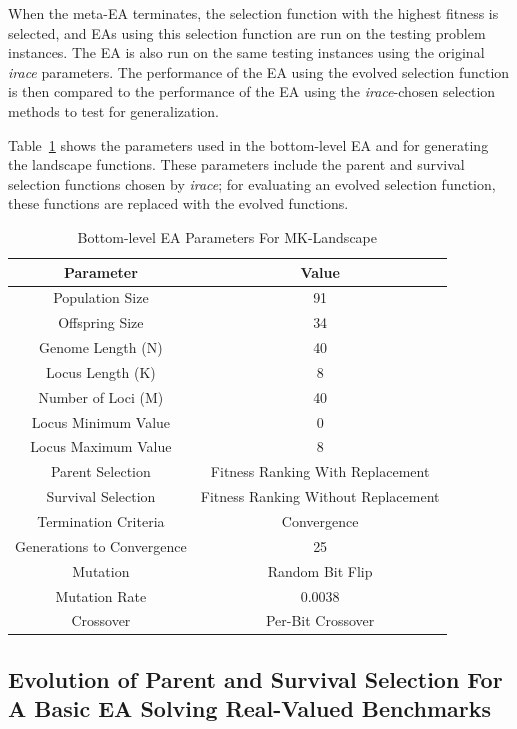 \documentclass[sigconf]{acmart}
\begin{document}
When the meta-EA terminates, the selection function with the highest fitness is selected, and EAs using this selection function are run on the testing problem instances. The EA is also run on the same testing instances using the original \textit{irace} parameters. The performance of the EA using the evolved selection function is then compared to the performance of the EA using the \textit{irace}-chosen selection methods to test for generalization.

Table~\ref{tab:Bottom-level EA Parameters For MK-Landscape} shows the parameters used in the bottom-level EA and for generating the landscape functions. These parameters include the parent and survival selection functions chosen by \textit{irace}; for evaluating an evolved selection function, these functions are replaced with the evolved functions.

\begin{table} 
	\centering
	\caption{Bottom-level EA Parameters For MK-Landscape}
	\label{tab:Bottom-level EA Parameters For MK-Landscape}
	\begin{tabular}{c|c}
		\toprule
		Parameter & Value\\
		\midrule
		Population Size & 91 \\
		\hline
		Offspring Size & 34\\
		\hline
		Genome Length (N) & 40 \\
		\hline
		Locus Length (K) & 8\\
		\hline
		Number of Loci (M) & 40 \\
		\hline
		Locus Minimum Value & 0\\
		\hline
		Locus Maximum Value & 8\\
		\hline
		Parent Selection & Fitness Ranking With Replacement \\
		\hline
		Survival Selection & Fitness Ranking Without Replacement \\
		\hline
		Termination Criteria & Convergence \\
		\hline
		Generations to Convergence & 25\\
		\hline
		Mutation & Random Bit Flip \\
		\hline
		Mutation Rate & 0.0038\\
		\hline
		Crossover & Per-Bit Crossover\\
		
		\bottomrule
	\end{tabular}
\end{table}

\subsection{Evolution of Parent and Survival Selection For A Basic EA Solving Real-Valued Benchmarks}
\label{Evolution of Parent and Survival Selection For A Basic EA Solving Real-Valued Benchmarks}
\end{document}
